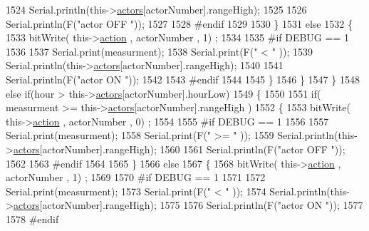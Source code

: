 \begin{DoxyCode}
1524                 Serial.println(this->\hyperlink{class_jetpack_a7e16d2f97837f9712a2e6de1c50d99db}{actors}[actorNumber].rangeHigh);
1525 
1526                 Serial.println(F(\textcolor{stringliteral}{"actor OFF "}));
1527 
1528 \textcolor{preprocessor}{            #endif  }
1529 
1530             \}
1531             \textcolor{keywordflow}{else} 
1532             \{
1533                 bitWrite( this->\hyperlink{class_jetpack_aca3142925a7b0834b34ae91d26af7765}{action} , actorNumber , 1) ;
1534 
1535 \textcolor{preprocessor}{            #if DEBUG == 1 }
1536 
1537                 Serial.print(measurment);
1538                 Serial.print(F(\textcolor{stringliteral}{" < "} ));
1539                 Serial.println(this->\hyperlink{class_jetpack_a7e16d2f97837f9712a2e6de1c50d99db}{actors}[actorNumber].rangeHigh);
1540 
1541                 Serial.println(F(\textcolor{stringliteral}{"actor ON "}));
1542 
1543 \textcolor{preprocessor}{            #endif  }
1544                 
1545             \}
1546         \}
1547     \}
1548     \textcolor{keywordflow}{else} \textcolor{keywordflow}{if}(hour > this->\hyperlink{class_jetpack_a7e16d2f97837f9712a2e6de1c50d99db}{actors}[actorNumber].hourLow)
1549     \{
1550 
1551         \textcolor{keywordflow}{if}( measurment >= this->\hyperlink{class_jetpack_a7e16d2f97837f9712a2e6de1c50d99db}{actors}[actorNumber].rangeHigh )
1552         \{
1553             bitWrite( this->\hyperlink{class_jetpack_aca3142925a7b0834b34ae91d26af7765}{action} , actorNumber , 0) ;
1554 
1555 \textcolor{preprocessor}{        #if DEBUG == 1 }
1556 
1557             Serial.print(measurment);
1558             Serial.print(F(\textcolor{stringliteral}{" >= "} ));
1559             Serial.println(this->\hyperlink{class_jetpack_a7e16d2f97837f9712a2e6de1c50d99db}{actors}[actorNumber].rangeHigh);
1560 
1561             Serial.println(F(\textcolor{stringliteral}{"actor OFF "}));
1562 
1563 \textcolor{preprocessor}{        #endif  }
1564 
1565         \}
1566         \textcolor{keywordflow}{else} 
1567         \{
1568             bitWrite( this->\hyperlink{class_jetpack_aca3142925a7b0834b34ae91d26af7765}{action} , actorNumber , 1) ;
1569 
1570 \textcolor{preprocessor}{        #if DEBUG == 1 }
1571 
1572             Serial.print(measurment);
1573             Serial.print(F(\textcolor{stringliteral}{" < "} ));
1574             Serial.println(this->\hyperlink{class_jetpack_a7e16d2f97837f9712a2e6de1c50d99db}{actors}[actorNumber].rangeHigh);
1575 
1576             Serial.println(F(\textcolor{stringliteral}{"actor ON "}));
1577 
1578 \textcolor{preprocessor}{        #endif  }

\end{DoxyCode}
